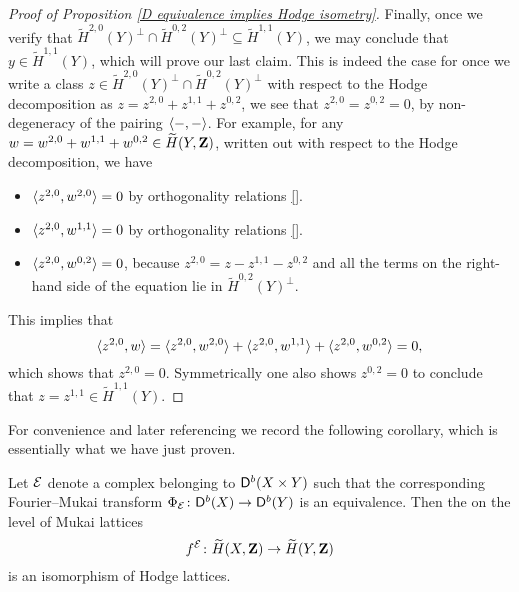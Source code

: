 \begin{proof}[Proof of Proposition \ref{D equivalence implies Hodge isometry}]
    Finally, once we verify that $\widetilde{H}^{2,0}(Y)^\perp \cap \widetilde{H}^{0,2}(Y)^\perp \subseteq \widetilde{H}^{1,1}(Y)$, we may conclude that $y \in \widetilde{H}^{1,1}(Y)$, which will prove our last claim.
    This is indeed the case for once we write a class $z \in \widetilde{H}^{2,0}(Y)^\perp \cap \widetilde{H}^{0,2}(Y)^\perp$ with respect to the Hodge decomposition as $z = z^{2,0} + z^{1,1} + z^{0,2}$, we see that $z^{2,0} = z^{0,2} = 0$, by non-degeneracy of the pairing $\langle -, - \rangle$. For example, for any $w = w^{2,0} + w^{1,1} + w^{0,2} \in \widetilde{H}(Y, \mathbf Z)$, written out with respect to the Hodge decomposition, we have 
    \begin{itemize}[label = $\circ$ ]
        \item{$\langle z^{2,0}, w^{2,0} \rangle = 0$ by orthogonality relations \eqref{}.
        }
        \item{
            $\langle z^{2,0}, w^{1,1} \rangle = 0$ by orthogonality relations \eqref{}.
        }
        \item{
            $\langle z^{2,0}, w^{0,2} \rangle = 0$, because $z^{2,0} = z - z^{1,1} - z^{0,2}$ and all the terms on the right-hand side of the equation lie in $\widetilde{H}^{0,2}(Y)^\perp$.
        }
    \end{itemize}
    This implies that
    \[
        \langle z^{2,0}, w \rangle = \langle z^{2,0}, w^{2,0} \rangle + \langle z^{2,0}, w^{1,1} \rangle + \langle z^{2,0}, w^{0,2} \rangle = 0,
    \]
    which shows that $z^{2,0} = 0$. Symmetrically one also shows $z^{0,2} = 0$ to conclude that $z = z^{1,1} \in \widetilde{H}^{1,1}(Y)$. \qedhere
    
    
    
    
\end{proof}

For convenience and later referencing we record the following corollary, which is essentially what we have just proven. 

\begin{corollary}
    \label{FM equivalence implies FM on Mukai is an isomorphism}
    Let $\mathcal E$ denote a complex belonging to $\mathsf{D}^b(X \times Y)$ such that the corresponding Fourier--Mukai transform $\Phi_{\mathcal E} \colon \mathsf{D}^b(X) \to \mathsf{D}^b(Y)$ is an equivalence. Then the on the level of Mukai lattices
    \[
        f^{\mathcal E} \colon \widetilde{H}(X, \mathbf Z) \to \widetilde{H}(Y, \mathbf Z)
    \]
    is an isomorphism of Hodge lattices.
\end{corollary}


